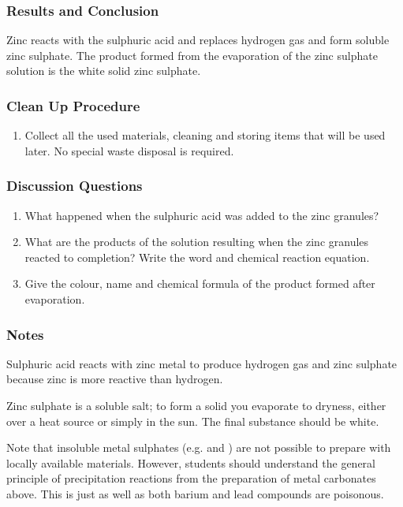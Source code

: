 \subsubsection*{Results and Conclusion}
Zinc reacts with the sulphuric acid and replaces hydrogen gas and form soluble zinc sulphate. The product formed from the evaporation of the zinc sulphate solution is the white solid zinc sulphate.

\subsubsection*{Clean Up Procedure}
\begin{enumerate}
\item{Collect all the used materials, cleaning and storing items that will be used later. No special waste disposal is required.}
\end{enumerate}

\subsubsection*{Discussion Questions}
\begin{enumerate}
\item{What happened when the sulphuric acid was added to the zinc granules?}
\item{What are the products of the solution resulting when the zinc granules reacted to completion? Write the word and chemical reaction equation.}
\item{Give the colour, name and chemical formula of the product formed after evaporation.}
\end{enumerate}

\subsubsection*{Notes}
Sulphuric acid reacts with zinc metal to produce hydrogen gas and zinc sulphate because zinc is more reactive than hydrogen.

Zinc sulphate is a soluble salt; to form a solid you evaporate to dryness, either over a heat source or simply in the sun. The final substance should be white.

Note that insoluble metal sulphates (e.g.  and ) are not possible to prepare with locally available materials. However, students should understand the general principle of precipitation reactions from the preparation of metal carbonates above. This is just as well as both barium and lead compounds are poisonous.

